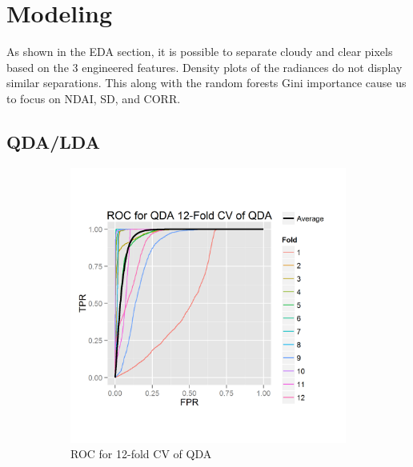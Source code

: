 \documentclass{article}\usepackage[]{graphicx}\usepackage[]{color}
\begin{document}
\section{Modeling} As shown in the EDA section, it is possible to separate cloudy and clear pixels based on the 3 engineered features. Density plots of the radiances do not display similar separations. This along with the random forests Gini importance cause us to focus on NDAI, SD, and CORR.

\subsection{QDA/LDA}

\begin{figure}[h]
  \centering 
  \begin{subfigure}[b]{0.3\textwidth}
    \includegraphics[width=\linewidth]{ROC_12_folds_DA.png}
    \caption{ROC for 12-fold CV of QDA}
    \label{12-foldROC}
  \end{subfigure}  
  \begin{subfigure}[b]{0.3\textwidth}

\end{subfigure}
\end{figure}
\end{document}
